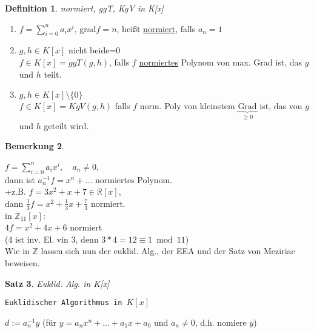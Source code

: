 \documentclass[a4paper,11pt]{article}
\newtheorem{definition}{Definition}[section]
\newtheorem{satz}[definition]{Satz}
\newtheorem{bem}[definition]{Bemerkung}
\begin{document}
\begin{definition}
	normiert, ggT, KgV in K[x]
\end{definition}
\begin{enumerate}[label=\alph*)]
	\item $f=\sum^n_{i=0}a_ix^i$, grad$f=n$, heißt \underline{normiert}, falls $a_n=1$ 
	\item $g,h\in K[x]$ nicht beide=0 \\
	$f\in K[x]=ggT(g,h)$, falls $f$ \underline{normiertes} Polynom von max. Grad ist, das $g$ und $h$ teilt.
	\item $g,h\in K[x]\setminus \{0\}$ \\
	$f\in K[x]=KgV(g,h)$ falls $f$ norm. Poly von kleinstem $\underbrace{\text{Grad}}_{\geq0}$ ist, das von $g$ und $h$ geteilt wird.
\end{enumerate}

\begin{bem}
\end{bem}
$f=\sum^n_{i=0}a_ix^i,\quad a_n\neq0$, \\
dann ist $a^{-1}_nf=x^n+...$ normiertes Polynom. \\+z.B. $f=3x^2+x+7\in\mathbb{R}[x]$, \\
dann $\frac{1}{3}f=x^2+\frac{1}{3}x+\frac{7}{3}$ normiert. \\
in $\mathbb{Z}_11[x]:$ \\
$4f=x^2+4x+6$ normiert \\
(4 ist inv. El. vin 3, denn $3*4=12\equiv1\bmod11$) \\
Wie in $\mathbb{Z}$ lassen sich nun der euklid. Alg., der EEA und der Satz von Meziriac beweisen.

\newpage

\begin{satz}
	Euklid. Alg. in K[x]
\end{satz}
\begin{algorithm}[!h]
	\caption{\texttt{Euklidischer Algorithmus in $K[x]$}}
	$d:=a^{-1}_ny$ (für $y=a_nx^n+...+a_1x+a_0$ und $a_n\neq0$, d.h. nomiere $y$) \\
\end{algorithm}
\end{document}
